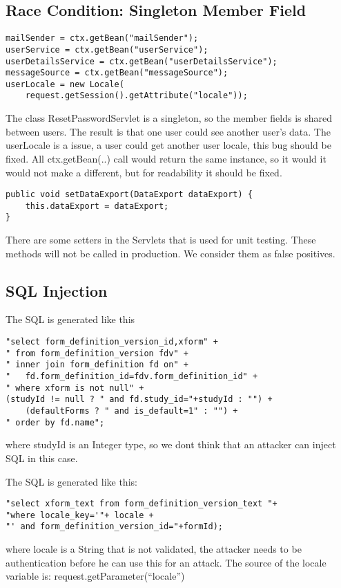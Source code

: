 \documentclass[11pt,a4paper]{article}
\theoremstyle{definition}
\begin{document}
\subsection{Race Condition: Singleton Member Field}
\begin{lstlisting}[caption=ResetPasswordServlet.java:78-82]
mailSender = ctx.getBean("mailSender");
userService = ctx.getBean("userService");
userDetailsService = ctx.getBean("userDetailsService");
messageSource = ctx.getBean("messageSource");
userLocale = new Locale(
	request.getSession().getAttribute("locale"));
\end{lstlisting}
The class ResetPasswordServlet is a singleton, so the member fields is shared between users.
The result is that one user could see another user's data.
The userLocale is a issue, a user could get another user locale, this bug should be fixed.
All ctx.getBean(..) call would return the same instance, so it would it would not make a different, but for readability it should be fixed.

\begin{lstlisting}[caption=DataExportServlet.java:116 ++]
public void setDataExport(DataExport dataExport) {
    this.dataExport = dataExport;
}
\end{lstlisting}
There are some setters in the Servlets that is used for unit testing. These methods will not be called in production.
We consider them as false positives.

\subsection{SQL Injection}
The SQL is generated like this
\begin{lstlisting}[caption=HibernateFormDownloadDAO.java:113]
"select form_definition_version_id,xform" +
" from form_definition_version fdv" +
" inner join form_definition fd on" +
"   fd.form_definition_id=fdv.form_definition_id" +
" where xform is not null" +
(studyId != null ? " and fd.study_id="+studyId : "") +
    (defaultForms ? " and is_default=1" : "") +
" order by fd.name";
\end{lstlisting}
where studyId is an Integer type, so we dont think that an attacker can inject SQL in this case.


The SQL is generated like this:
\begin{lstlisting}[caption=HibernateFormDownloadDAO.java:149]
"select xform_text from form_definition_version_text "+
"where locale_key='"+ locale +
"' and form_definition_version_id="+formId);
\end{lstlisting}
where locale is a String that is not validated, the attacker needs to be authentication before he can use this for an attack.
The source of the locale variable is: request.getParameter(``locale'')
\end{document}
